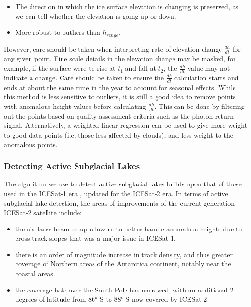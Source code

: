 \begin{itemize}
  \item The direction in which the ice surface elevation is changing is preserved, as we can tell whether the elevation is going up or down.
  \item More robust to outliers than $h_{range}$.
\end{itemize}

However, care should be taken when interpreting rate of elevation change $\frac{dh}{dt}$ for any given point.
Fine scale details in the elevation change may be masked, for example, if the surface were to rise at $t_1$ and fall at $t_2$, the $\frac{dh}{dt}$ value may not indicate a change.
Care should be taken to ensure the $\frac{dh}{dt}$ calculation starts and ends at about the same time in the year to account for seasonal effects.
While this method is less sensitive to outliers, it is still a good idea to remove points with anomalous height values before calculating $\frac{dh}{dt}$.
This can be done by filtering out the points based on quality assessment criteria such as the photon return signal.
Alternatively, a weighted linear regression can be used to give more weight to good data points (i.e. those less affected by clouds), and less weight to the anomalous points.

\subsubsection{Detecting Active Subglacial Lakes}

The algorithm we use to detect active subglacial lakes builds upon that of those used in the ICESat-1 era \citep{FrickerActiveSubglacialWater2007,Smithinventoryactivesubglacial2009}, updated for the ICESat-2 era.
In terms of active subglacial lake detection, the areas of improvements of the current generation ICESat-2 satellite include:

\begin{itemize}
  \item the six laser beam setup allow us to better handle anomalous heights due to cross-track slopes that was a major issue in ICESat-1.
  \item there is an order of magnitude increase in track density, and thus greater coverage of Northern areas of the Antarctica continent, notably near the coastal areas.
  \item the coverage hole over the South Pole has narrowed, with an additional 2 degrees of latitude from 86° S to 88° S now covered by ICESat-2
\end{itemize}

